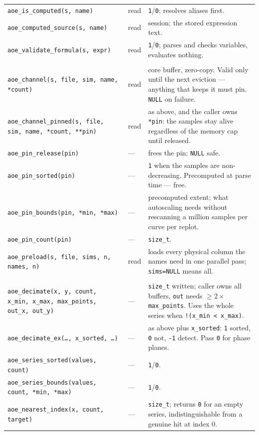 \documentclass[11pt,a4paper,oneside]{report}
\newcommand{\code}[1]{\texttt{#1}}
\begin{document}
\begin{longtable}{@{}p{}p{}p{}@{}}
\code{aoe\_is\_computed(s, name)} & read & \code{1}/\code{0}; resolves aliases first. \\
\code{aoe\_computed\_source(s, name)} & read & session; the stored expression text. \\
\code{aoe\_validate\_formula(s, expr)} & read & \code{1}/\code{0}; parses and checks variables, evaluates nothing. \\
\addlinespace
\multicolumn{3}{@{}l@{}}{\textit{Samples}} \\
\code{aoe\_channel(s, file, sim, name, *count)} & read & core buffer, zero-copy. Valid only until the next eviction --- anything that keeps it must pin. \code{NULL} on failure. \\
\code{aoe\_channel\_pinned(s, file, sim, name, *count, **pin)} & read & as above, and the caller owns \code{*pin}: the samples stay alive regardless of the memory cap until released. \\
\code{aoe\_pin\_release(pin)} & --- & frees the pin; \code{NULL} safe. \\
\code{aoe\_pin\_sorted(pin)} & --- & \code{1} when the samples are non-decreasing. Precomputed at parse time --- free. \\
\code{aoe\_pin\_bounds(pin, *min, *max)} & --- & precomputed extent; what autoscaling needs without rescanning a million samples per curve per replot. \\
\code{aoe\_pin\_count(pin)} & --- & \code{size\_t}. \\
\code{aoe\_preload(s, file, sims, n, names, n)} & read & loads every physical column the names need in one parallel pass; \code{sims=NULL} means all. \\
\addlinespace
\multicolumn{3}{@{}l@{}}{\textit{Pure mathematics --- no session, fully re-entrant}} \\
\code{aoe\_decimate(x, y, count, x\_min, x\_max, max\_points, out\_x, out\_y)} & --- & \code{size\_t} written; caller owns all buffers, \code{out} needs $\ge 2\times$\code{max\_points}. Uses the whole series when \code{!(x\_min < x\_max)}. \\
\code{aoe\_decimate\_ex(\ldots, x\_sorted, \ldots)} & --- & as above plus \code{x\_sorted}: \code{1} sorted, \code{0} not, \code{-1} detect. Pass \code{0} for phase planes. \\
\code{aoe\_series\_sorted(values, count)} & --- & \code{1}/\code{0}. \\
\code{aoe\_series\_bounds(values, count, *min, *max)} & --- & \code{1}/\code{0}. \\
\code{aoe\_nearest\_index(x, count, target)} & --- & \code{size\_t}; returns \code{0} for an empty series, indistinguishable from a genuine hit at index 0. \\

\end{longtable}
\end{document}
